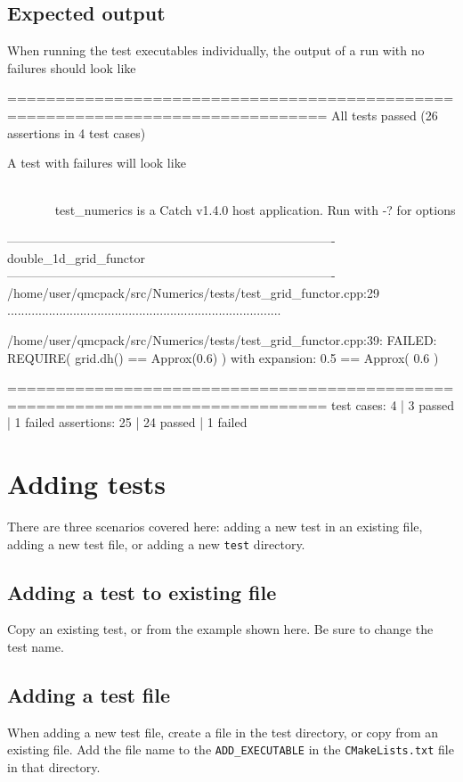 \subsection{Expected output}

When running the test executables individually, the output of a run with no failures should look like
\begin{shade}
===============================================================================
All tests passed (26 assertions in 4 test cases)
\end{shade}

A test with failures will look like

\begin{minipage}{\linewidth}
\begin{shade}
~~~~~~~~~~~~~~~~~~~~~~~~~~~~~~~~~~~~~~~~~~~~~~~~~~~~~~~~~~~~~~~~~~~~~~~~~~~~~~~
test_numerics is a Catch v1.4.0 host application.
Run with -? for options

-------------------------------------------------------------------------------
double_1d_grid_functor
-------------------------------------------------------------------------------
/home/user/qmcpack/src/Numerics/tests/test_grid_functor.cpp:29
...............................................................................

/home/user/qmcpack/src/Numerics/tests/test_grid_functor.cpp:39: FAILED:
  REQUIRE( grid.dh() == Approx(0.6) )
with expansion:
  0.5 == Approx( 0.6 )

===============================================================================
test cases:  4 |  3 passed | 1 failed
assertions: 25 | 24 passed | 1 failed
\end{shade}
\end{minipage}


\section{Adding tests}
There are three scenarios covered here: adding a new test in an existing file, adding a new test file, or adding a new \texttt{test} directory.

\subsection{Adding a test to existing file}
Copy an existing test, or from the example shown here.  Be sure to change the test name.

\subsection{Adding a test file}
When adding a new test file,
create a file in the test directory, or copy from an existing file.  Add the file name to the \texttt{ADD\_EXECUTABLE} in the \texttt{CMakeLists.txt} file in that directory.

